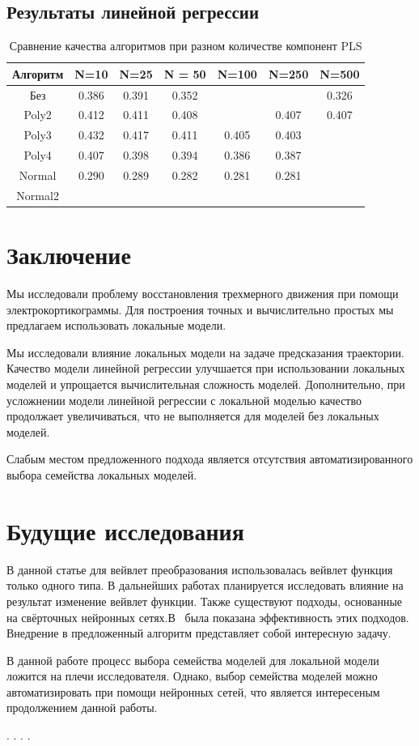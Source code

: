 \documentclass[12pt, twoside]{article}
\begin{document}
\subsection{Результаты линейной регрессии}
\begin{table}[h]
	\centering
	\begin{tabular}{|c|c|c|c|c|c|c|}
		\hline
		Алгоритм & N=10 & N=25 & N = 50& N=100 & N=250 & N=500 \\ \hline
		Без&0.386&0.391&0.352& &&0.326\\ \hline
		Poly2&0.412&0.411&0.408&&0.407&0.407     \\ \hline
		Poly3&0.432&0.417    &0.411&0.405       &0.403&       \\ \hline
		Poly4&0.407&0.398&0.394&0.386&0.387&      \\ \hline
		Normal&0.290&0.289 &0.282&0.281      &0.281&      \\ \hline
		Normal2&&      &      &       &&      \\ \hline
	\end{tabular}
	\caption{Сравнение качества алгоритмов при разном количестве компонент PLS}
\end{table}
\FloatBarrier
\section{Заключение}
Мы исследовали проблему восстановления трехмерного движения при помощи электрокортикограммы.
Для построения точных и вычислительно простых
мы предлагаем использовать локальные модели.

 Мы исследовали влияние локальных модели на задаче предсказания траектории. Качество модели линейной регрессии улучшается при использовании локальных моделей и упрощается вычислительная сложность моделей. Дополнительно, при усложнении модели линейной регрессии с локальной моделью качество продолжает увеличиваться, что не выполняется для моделей без локальных моделей.

Слабым местом предложенного подхода является отсутствия автоматизированного выбора семейства локальных моделей.

\section{Будущие исследования}

В данной статье для вейвлет преобразования использовалась вейвлет функция только одного типа. В дальнейших работах планируется исследовать влияние на результат изменение вейвлет функции. Также существуют подходы, основанные на свёрточных нейронных сетях.В~\cite{lawhern1611eegnet,walker2015deep} была показана эффективность этих подходов. Внедрение в предложенный алгоритм представляет собой интересную задачу.

В данной работе процесс выбора семейства моделей для локальной модели ложится на плечи исследователя. Однако, выбор семейства моделей можно автоматизировать при помощи нейронных сетей, что является интересеным продолжением данной работы.

\newpage
.
\newpage
.
\newpage
.
\newpage
.
\newpage



\end{document}
